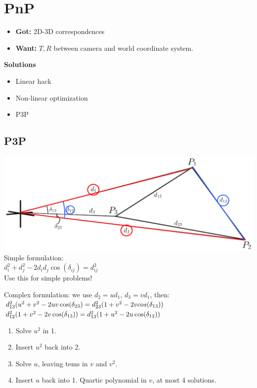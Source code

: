\section{PnP}
\begin{itemize}
  \item \textbf{Got:} 2D-3D correspondences
  \item \textbf{Want:} $T, R$ between camera and world coordinate
    system.
\end{itemize}

\textbf{Solutions}
\begin{itemize}
  \item Linear hack
  \item Non-linear optimization
  \item P3P
\end{itemize}

\subsection*{P3P}
\includegraphics[width=\linewidth]{Images/P3P.png}
Simple formulation:\\
$d_i^2 + d_j^2 - 2 d_i d_j \cos(\delta_{ij}) = d_{ij}^2$\\
\alert{Use this for simple problems!}

Complex formulation: we use $d_2 = u d_1$, $d_3 = v d_1$, then:\\
$d_{13}^2 (u^2 + v^2 - 2 u v \cos(\delta_{23}) \\= 
d_{23}^2(1+v^2 - 2 v cos(\delta_{13}))$\\
$d_{12}^2 (1 + v^2 - 2v \cos(\delta_{13})) \\=
d_{13}^2 (1 + u^2 - 2u \cos(\delta_{12}))$
\begin{enumerate}
  \item Solve $u^2$ in 1.
  \item Insert $u^2$ back into 2.
  \item Solve $u$, leaving tems in $v$ and $v^2$.
  \item Insert $u$ back into 1. Quartic polynomial in $v$, at most 4
    solutions.
\end{enumerate}
